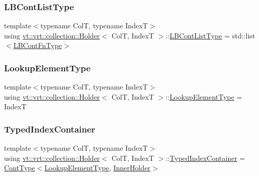 \subsubsection{\texorpdfstring{L\+B\+Cont\+List\+Type}{LBContListType}}
{\footnotesize\ttfamily template$<$typename ColT, typename IndexT$>$ \\
using \hyperlink{structvt_1_1vrt_1_1collection_1_1_holder}{vt\+::vrt\+::collection\+::\+Holder}$<$ ColT, IndexT $>$\+::\hyperlink{structvt_1_1vrt_1_1collection_1_1_holder_af26a59243dd4e1a86d8fcf320a8dc463}{L\+B\+Cont\+List\+Type} =  std\+::list$<$\hyperlink{structvt_1_1vrt_1_1collection_1_1_holder_a01812f8ee06d3a67e1a9aa2765989913}{L\+B\+Cont\+Fn\+Type}$>$}

\mbox{\label{structvt_1_1vrt_1_1collection_1_1_holder_a3206c3e5eb5d6deb4667409222163b77}} 
\subsubsection{\texorpdfstring{Lookup\+Element\+Type}{LookupElementType}}
{\footnotesize\ttfamily template$<$typename ColT, typename IndexT$>$ \\
using \hyperlink{structvt_1_1vrt_1_1collection_1_1_holder}{vt\+::vrt\+::collection\+::\+Holder}$<$ ColT, IndexT $>$\+::\hyperlink{structvt_1_1vrt_1_1collection_1_1_holder_a3206c3e5eb5d6deb4667409222163b77}{Lookup\+Element\+Type} =  IndexT}

\mbox{\label{structvt_1_1vrt_1_1collection_1_1_holder_ae8d4ff940c971d52b237cf4d6049380a}} 
\subsubsection{\texorpdfstring{Typed\+Index\+Container}{TypedIndexContainer}}
{\footnotesize\ttfamily template$<$typename ColT, typename IndexT$>$ \\
using \hyperlink{structvt_1_1vrt_1_1collection_1_1_holder}{vt\+::vrt\+::collection\+::\+Holder}$<$ ColT, IndexT $>$\+::\hyperlink{structvt_1_1vrt_1_1collection_1_1_holder_ae8d4ff940c971d52b237cf4d6049380a}{Typed\+Index\+Container} =  \hyperlink{structvt_1_1vrt_1_1collection_1_1_holder_ae3bb115b69cf47e14a4e8441cebe9142}{Cont\+Type}$<$\hyperlink{structvt_1_1vrt_1_1collection_1_1_holder_a3206c3e5eb5d6deb4667409222163b77}{Lookup\+Element\+Type}, \hyperlink{structvt_1_1vrt_1_1collection_1_1_holder_aafc9b515450179bad7f03e17010b59f8}{Inner\+Holder}$>$}

